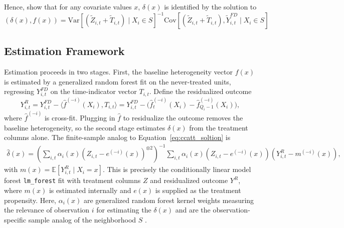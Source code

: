 \documentclass[12pt,notitlepage]{article}
\newcommand{\E}{\mathbb{E}}
\newcommand{\Var}{\mathrm{Var}}
\newcommand{\Cov}{\mathrm{Cov}}
\renewcommand{\eqref}[1]{Equation~\ref{#1}}
\begin{document}
Hence, \cite{athey_generalized_2019} show that for any covariate values $x$, $\delta(x)$ is identified by the solution to
\begin{equation} \label{eq:ccatt_soltion}
(\delta(x), f(x)) = \Var[(\widetilde{Z}_{i,t} + \widetilde{T}_{i,t}) \mid X_i \in S]^{-1} \Cov[(\widetilde{Z}_{i,t} + \widetilde{T}_{i,t}), \widetilde{Y}_{i,t}^{FD} \mid X_i \in S] 
\end{equation}

\subsection{Estimation Framework}
Estimation proceeds in two stages.
First, the baseline heterogeneity vector $f(x)$ is estimated by a generalized random forest fit on the never-treated units, regressing $Y_{i,t}^{FD}$ on the time-indicator vector $T_{i,t}$.
Define the residualized outcome
\[
Y_{i,t}^{R} = Y_{i,t}^{FD} - \langle \hat f^{(-i)}(X_i), T_{i,t}\rangle = Y_{i,t}^{FD} - \big(\hat f_t^{(-i)}(X_i) - \hat f_{Q_i-1}^{(-i)}(X_i)\big),
\]
where $\hat f^{(-i)}$ is cross-fit.
Plugging in $\hat f$ to residualize the outcome removes the baseline heterogeneity, so the second stage estimates $\delta(x)$ from the treatment columns alone.
The finite-sample analog to \eqref{eq:ccatt_soltion} is
\begin{align*} \label{eq:catt-x-est}
\hat{\delta}(x) = \left(\sum_{i,t} \alpha_i(x) \left( Z_{i, t} - e^{(-i)}(x)\right)^{\otimes 2}\right)^{-1} \sum_{i,t} \alpha_i(x) \left( Z_{i, t} - e^{(-i)}(x)\right)\left(Y_{i,t}^{R} - m^{(-i)}(x)\right),
\end{align*}
with $m(x) = \E[Y_{i,t}^{R}\mid X_i = x]$.
This is precisely the conditionally linear model forest \texttt{lm\_forest} fit with treatment columns $Z$ and residualized outcome $Y^{R}$, where $m(x)$ is estimated internally and $e(x)$ is supplied as the treatment propensity.
Here, $\alpha_i(x)$ are generalized random forest kernel weights measuring the relevance of observation $i$ for estimating the $\delta(x)$ and are the observation-specific sample analog of the neighborhood $S$ \citep{athey_generalized_2019}.
\end{document}
